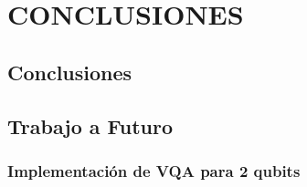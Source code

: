 \documentclass[letterpaper,12pt]{thesisECFM}
\theoremstyle{plain}
\theoremstyle{definition}
\theoremstyle{remark}
\newcommand{\1}{\mathbb{1}}
\begin{document}
\chapter{CONCLUSIONES} %
\section{Conclusiones}
\section{Trabajo a Futuro}
\subsection{Implementación de VQA para 2 qubits}
\appendix




\end{document}
